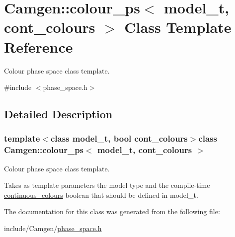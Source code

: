 \hypertarget{a00084}{}\section{Camgen\+:\+:colour\+\_\+ps$<$ model\+\_\+t, cont\+\_\+colours $>$ Class Template Reference}
\label{a00084}


Colour phase space class template.  




{\ttfamily \#include $<$phase\+\_\+space.\+h$>$}



\subsection{Detailed Description}
\subsubsection*{template$<$class model\+\_\+t, bool cont\+\_\+colours$>$class Camgen\+::colour\+\_\+ps$<$ model\+\_\+t, cont\+\_\+colours $>$}

Colour phase space class template. 

Takes as template parameters the model type and the compile-\/time \hyperlink{a00103}{continuous\+\_\+colours} boolean that should be defined in model\+\_\+t. 

The documentation for this class was generated from the following file\+:\begin{DoxyCompactItemize}
\item 
include/\+Camgen/\hyperlink{a00718}{phase\+\_\+space.\+h}\end{DoxyCompactItemize}

